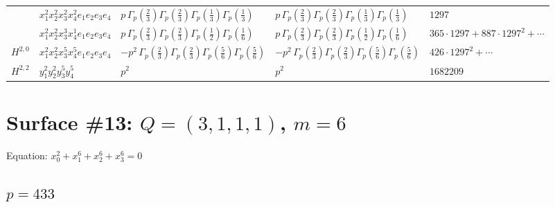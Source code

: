 \documentclass[11pt]{article}
\begin{document}
\begin{table}[ht]
{\begin{tabular}{@{}lllll@{}}
 & $x_{1}^{2} x_{2}^{2} x_{3}^{2} x_{4}^{2}  e_{1} e_{2} e_{3} e_{4}$ & $p \, \Gamma_p \left( \frac{2}{3} \right) \Gamma_p \left( \frac{2}{3} \right) \Gamma_p \left( \frac{1}{3} \right) \Gamma_p \left( \frac{1}{3} \right)$ & $p \, \Gamma_p \left( \frac{2}{3} \right) \Gamma_p \left( \frac{2}{3} \right) \Gamma_p \left( \frac{1}{3} \right) \Gamma_p \left( \frac{1}{3} \right)$ & $1297$ \\
 & $x_{1}^{2} x_{2}^{2} x_{3}^{3} x_{4}^{1}  e_{1} e_{2} e_{3} e_{4}$ & $p \, \Gamma_p \left( \frac{2}{3} \right) \Gamma_p \left( \frac{2}{3} \right) \Gamma_p \left( \frac{1}{2} \right) \Gamma_p \left( \frac{1}{6} \right)$ & $p \, \Gamma_p \left( \frac{2}{3} \right) \Gamma_p \left( \frac{2}{3} \right) \Gamma_p \left( \frac{1}{2} \right) \Gamma_p \left( \frac{1}{6} \right)$ & $365{\cdot}1297{+}887{\cdot}1297^{2}{+}\cdots$ \\
\midrule
$H^{2,0}$ & $x_{1}^{2} x_{2}^{2} x_{3}^{5} x_{4}^{5}  e_{1} e_{2} e_{3} e_{4}$ & $- p^{2} \, \Gamma_p \left( \frac{2}{3} \right) \Gamma_p \left( \frac{2}{3} \right) \Gamma_p \left( \frac{5}{6} \right) \Gamma_p \left( \frac{5}{6} \right)$ & $- p^{2} \, \Gamma_p \left( \frac{2}{3} \right) \Gamma_p \left( \frac{2}{3} \right) \Gamma_p \left( \frac{5}{6} \right) \Gamma_p \left( \frac{5}{6} \right)$ & $426{\cdot}1297^{2}{+}\cdots$ \\
\midrule
$H^{2,2}$ & $y_{1}^{2} y_{2}^{2} y_{3}^{5} y_{4}^{5}$ & $p^{2} \,$ & $p^{2} \,$ & $1682209$ \\
\bottomrule
\end{tabular}
}
\renewcommand{\arraystretch}{1.0}
\end{table}

\newpage

\section*{Surface \#13: $Q=(3, 1, 1, 1)$, $m=6$}

Equation: $x_0^{2} + x_1^{6} + x_2^{6} + x_3^{6} = 0$

\subsection*{$p = 433$}
\end{document}
